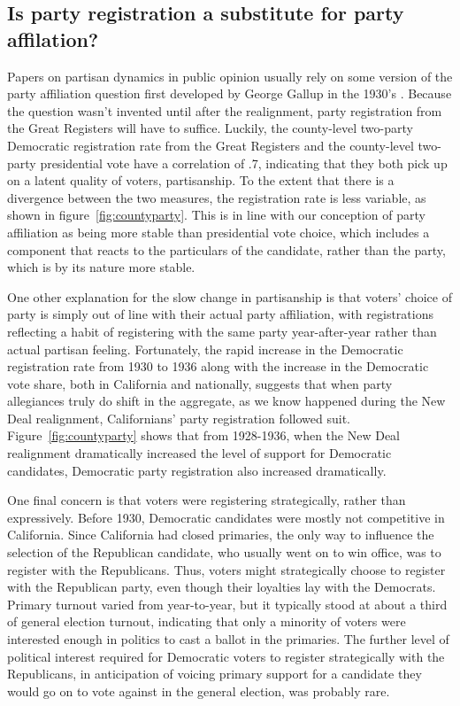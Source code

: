 \documentclass[11pt]{scrartcl}\usepackage[]{graphicx}\usepackage[]{color}
\begin{document}
\subsection*{Is party registration a substitute for party affilation?}



Papers on partisan dynamics in public opinion usually rely on some version of the party affiliation question first developed by George Gallup in the 1930's \citep{clarke2009dynamics}. Because the question wasn't invented until after the realignment, party registration from the Great Registers will have to suffice. Luckily, the county-level two-party Democratic registration rate from the Great Registers and the county-level two-party presidential vote have a correlation of .7, indicating that they both pick up on a latent quality of voters, partisanship. To the extent that there is a divergence between the two measures, the registration rate is less variable, as shown in figure~\ref{fig:countyparty}. This is in line with our conception of party affiliation as being more stable than presidential vote choice, which includes a component that reacts to the particulars of the candidate, rather than the party, which is by its nature more stable. 

One other explanation for the slow change in partisanship is that voters' choice of party is simply out of line with their actual party affiliation, with registrations reflecting a habit of registering with the same party year-after-year rather than actual partisan feeling.  Fortunately, the rapid increase in the Democratic registration rate from 1930 to 1936 along with the increase in the Democratic vote share, both in California and nationally, suggests that when party allegiances truly do shift in the aggregate, as we know happened during the New Deal realignment, Californians' party registration followed suit. Figure~\ref{fig:countyparty} shows that from 1928-1936, when the New Deal realignment dramatically increased the level of support for Democratic candidates, Democratic party registration also increased dramatically. 

One final concern is that voters were registering strategically, rather than expressively. Before 1930, Democratic candidates were mostly not competitive in California. Since California had closed primaries, the only way to influence the selection of the Republican candidate, who usually went on to win office, was to register with the Republicans. Thus, voters might strategically choose to register with the Republican party, even though their loyalties lay with the Democrats.  Primary turnout varied from year-to-year, but it typically stood at about a third of general election turnout, indicating that only a minority of voters were interested enough in politics to cast a ballot in the primaries. The further level of political interest required for Democratic voters to register strategically with the Republicans, in anticipation of voicing primary support for a candidate they would go on to vote against in the general election, was probably rare.
\end{document}
